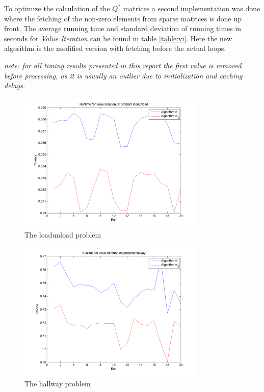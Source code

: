 \documentclass[10pt,a4paper]{article}
\begin{document}
To optimize the calculation of the $Q^{*}$ matrices a second implementation was done where the fetching of the non-zero elements from sparse matrices is done up front. 
The average running time and standard deviation of running times in seconds for \emph{Value Iteration} can be found in table \ref{table:vi}.
Here the new algorithm is the modified version with fetching before the actual loops.
\begin{framed}
\textit{note: for all timing results presented in this report the first value is removed before processing, as it is usually an outlier due to initialization and caching delays.}
\end{framed}
\begin{figure}
\vspace{-20pt}
\hspace{-30pt}
\centering
\includegraphics[width=0.8\textwidth]{Timings/loadunload/timings_vi.png}
\hspace{-30pt}
\caption{The loadunload problem}
\label{fig:vi_loadunload}
\vspace{-20pt}
\end{figure}

\begin{figure}
\vspace{-20pt}
\hspace{-30pt}
\centering
\includegraphics[width=0.8\textwidth]{Timings/hallway/timings_vi.png}
\caption{The hallway problem}
\hspace{-30pt}
\label{fig:vi_hallway}
\vspace{-20pt}
\end{figure}
        
\end{document}
